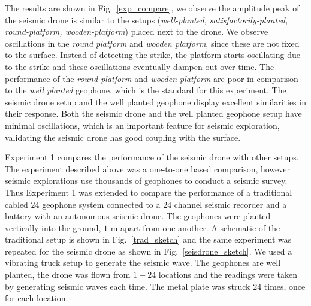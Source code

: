 The results are shown in Fig.~\ref{exp_compare}, we observe the amplitude peak of the seismic drone is similar to the setups (\emph{well-planted, satisfactorily-planted, round-platform, wooden-platform}) placed next to the drone. We observe oscillations in the \emph{round platform} and \emph{wooden platform}, since these are not fixed to the surface. Instead of detecting the strike, the platform starts oscillating due to the strike and these oscillations eventually dampen out over time. The performance of the \emph{round platform} and \emph{wooden platform} are poor in comparison to the \emph{well planted} geophone, which is the standard for this experiment. The seismic drone setup and the well planted geophone display excellent similarities in their response. Both the seismic drone and the well planted geophone setup have minimal oscillations, which is an important feature for seismic exploration, validating the seismic drone has good coupling with the surface.  

Experiment 1 compares the performance of the seismic drone with other setups. The experiment described above was a one-to-one based comparison, however seismic explorations use thousands of geophones to conduct a seismic survey. Thus Experiment 1 was extended to compare the performance of a traditional cabled $24$ geophone system connected to a $24$ channel seismic recorder and a battery with an autonomous seismic drone. The geophones were planted vertically into the ground, $1$ m apart from one another.  A schematic of the traditional setup is shown in Fig.~\ref{trad_sketch} and the same experiment was repeated for the seismic drone as shown in Fig.~\ref{seisdrone_sketch}. We used a vibrating truck setup to generate the seismic wave. The geophones are well planted, the drone was flown from $1-24$ locations and the readings were taken by generating seismic waves each time. The metal plate was struck $24$ times, once for each location.

